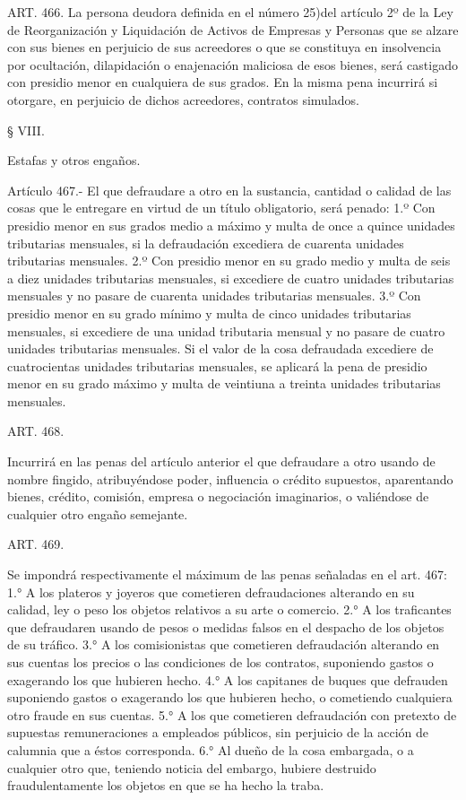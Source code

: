     ART. 466.
    La persona deudora definida en el número 25)del artículo 2º de la Ley de Reorganización y Liquidación de Activos de Empresas y Personas que se alzare con sus bienes en perjuicio de sus acreedores o que se constituya en insolvencia por ocultación, dilapidación o enajenación maliciosa de esos bienes, será castigado con presidio menor en cualquiera de sus grados.
    En la misma pena incurrirá si otorgare, en perjuicio de dichos acreedores, contratos simulados.


    § VIII.

    Estafas y otros engaños.





    Artículo 467.- El que defraudare a otro en la sustancia, cantidad o calidad de las cosas que le entregare en virtud de un título obligatorio, será penado:
    1.º Con presidio menor en sus grados medio a máximo y multa de once a quince unidades tributarias mensuales, si la defraudación excediera de cuarenta unidades tributarias mensuales.
    2.º Con presidio menor en su grado medio y multa de seis a diez unidades tributarias mensuales, si excediere de cuatro unidades tributarias mensuales y no pasare de cuarenta unidades tributarias mensuales.
    3.º Con presidio menor en su grado mínimo y multa de cinco unidades tributarias mensuales, si excediere de una unidad tributaria mensual y no pasare de cuatro unidades tributarias mensuales.
    Si el valor de la cosa defraudada excediere de cuatrocientas unidades tributarias mensuales, se aplicará la pena de presidio menor en su grado máximo y multa de veintiuna a treinta unidades tributarias mensuales.



    ART. 468.

    Incurrirá en las penas del artículo anterior el que defraudare a otro usando de nombre fingido, atribuyéndose poder, influencia o crédito supuestos, aparentando bienes, crédito, comisión, empresa o negociación imaginarios, o valiéndose de cualquier otro engaño semejante.


    ART. 469.

    Se impondrá respectivamente el máximum de las penas señaladas en el art. 467:
    1.° A los plateros y joyeros que cometieren defraudaciones alterando en su calidad, ley o peso los objetos relativos a su arte o comercio.
    2.° A los traficantes que defraudaren usando de pesos o medidas falsos en el despacho de los objetos de su tráfico.
    3.° A los comisionistas que cometieren defraudación alterando en sus cuentas los precios o las condiciones de los contratos, suponiendo gastos o exagerando los que hubieren hecho.
    4.° A los capitanes de buques que defrauden suponiendo gastos o exagerando los que hubieren hecho, o cometiendo cualquiera otro fraude en sus cuentas.
    5.° A los que cometieren defraudación con pretexto de supuestas remuneraciones a empleados públicos, sin perjuicio de la acción de calumnia que a éstos corresponda.
    6.° Al dueño de la cosa embargada, o a cualquier otro que, teniendo noticia del embargo, hubiere destruido fraudulentamente los objetos en que se ha hecho la traba.



